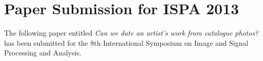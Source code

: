\chapter{Paper Submission for ISPA 2013}

The following paper entitled \emph{Can we date an artist's work from catalogue photos?}\cite{Brown2013Can} has been 
submitted for the 8th International Symposium on Image and Signal Processing and Analysis.


